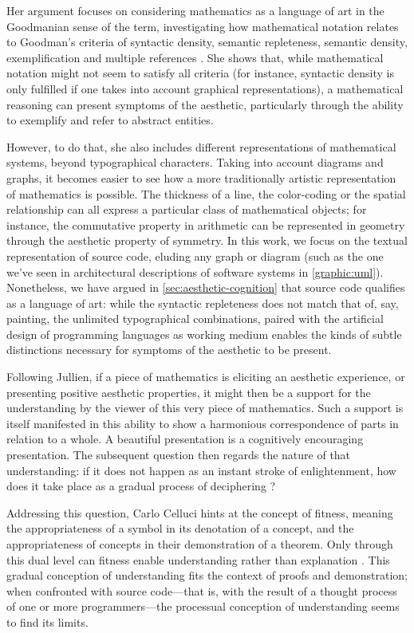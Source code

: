 Her argument focuses on considering mathematics as a language of art in the Goodmanian sense of the term, investigating how mathematical notation relates to Goodman's criteria of syntactic density, semantic repleteness, semantic density, exemplification and multiple references \citep{jullien_languages_2012}. She shows that, while mathematical notation might not seem to satisfy all criteria (for instance, syntactic density is only fulfilled if one takes into account graphical representations), a mathematical reasoning can present symptoms of the aesthetic, particularly through the ability to exemplify and refer to abstract entities.

However, to do that, she also includes different representations of mathematical systems, beyond typographical characters. Taking into account diagrams and graphs, it becomes easier to see how a more traditionally artistic representation of mathematics is possible. The thickness of a line, the color-coding or the spatial relationship can all express a particular class of mathematical objects; for instance, the commutative property in arithmetic can be represented in geometry through the aesthetic property of symmetry. In this work, we focus on the textual representation of source code, eluding any graph or diagram (such as the one we've seen in architectural descriptions of software systems in \ref{graphic:uml}). Nonetheless, we have argued in \ref{sec:aesthetic-cognition} that source code qualifies as a language of art: while the syntactic repleteness does not match that of, say, painting, the unlimited typographical combinations, paired with the artificial design of programming languages as working medium enables the kinds of subtle distinctions necessary for symptoms of the aesthetic to be present.

Following Jullien, if a piece of mathematics is eliciting an aesthetic experience, or presenting positive aesthetic properties, it might then be a support for the understanding by the viewer of this very piece of mathematics. Such a support is itself manifested in this ability to show a harmonious correspondence of parts in relation to a whole. A beautiful presentation is a cognitively encouraging presentation. The subsequent question then regards the nature of that understanding: if it does not happen as an instant stroke of enlightenment, how does it take place as a gradual process of deciphering \citep{rota_phenomenology_1997}?

Addressing this question, Carlo Celluci hints at the concept of fitness, meaning the appropriateness of a symbol in its denotation of a concept, and the appropriateness of concepts in their demonstration of a theorem. Only through this dual level can fitness enable understanding rather than explanation \citep{cellucci_mathematical_2015}. This gradual conception of understanding fits the context of proofs and demonstration; when confronted with source code—that is, with the result of a thought process of one or more programmers—the processual conception of understanding seems to find its limits.

